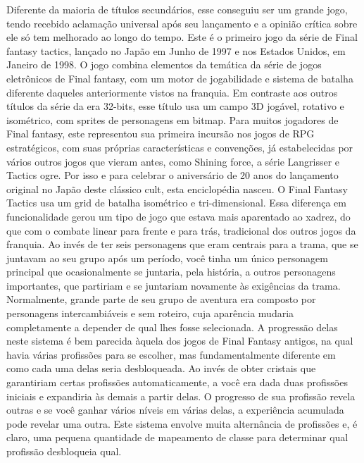 Diferente da maioria de títulos secundários, esse conseguiu ser um grande jogo, tendo recebido aclamação universal após seu lançamento e a opinião crítica sobre ele só tem melhorado ao longo do tempo.
Este é o primeiro jogo da série de Final fantasy tactics, lançado no Japão em Junho de 1997 e nos Estados Unidos, em Janeiro de 1998.
O jogo combina elementos da temática da série de jogos eletrônicos de Final fantasy, com um motor de jogabilidade e sistema de batalha diferente daqueles anteriormente vistos na franquia.
Em contraste aos outros títulos da série da era 32-bits, esse título usa um campo 3D jogável, rotativo e isométrico, com sprites de personagens em bitmap.
Para muitos jogadores de Final fantasy, este representou sua primeira incursão nos jogos de RPG estratégicos, com suas próprias características e convenções, já estabelecidas por vários outros jogos que vieram antes, como Shining force, a série Langrisser e Tactics ogre.
Por isso e para celebrar o aniversário de 20 anos do lançamento original no Japão deste clássico cult, esta enciclopédia nasceu.
%
\vfill
%
O Final Fantasy Tactics usa um grid de batalha isométrico e tri-dimensional.
Essa diferença em funcionalidade gerou um tipo de jogo que estava mais aparentado ao xadrez, do que com o combate linear para frente e para trás, tradicional dos outros jogos da franquia.
Ao invés de ter seis personagens que eram centrais para a trama, que se juntavam ao seu grupo após um período, você tinha um único personagem principal que ocasionalmente se juntaria, pela história, a outros personagens importantes, que partiriam e se juntariam novamente às exigências da trama.
Normalmente, grande parte de seu grupo de aventura era composto por personagens intercambiáveis e sem roteiro, cuja aparência mudaria completamente a depender de qual  lhes fosse selecionada.
A progressão delas neste sistema é bem parecida àquela dos jogos de Final Fantasy antigos, na qual havia várias profissões para se escolher, mas fundamentalmente diferente em como cada uma delas seria desbloqueada.
Ao invés de obter cristais que garantiriam certas profissões automaticamente, a você era dada duas profissões iniciais e expandiria às demais a partir delas.
O progresso de sua profissão revela outras e se você ganhar vários níveis em várias delas, a experiência acumulada pode revelar uma outra.
Este sistema envolve muita alternância de profissões e, é claro, uma pequena quantidade de mapeamento de classe para determinar qual profissão desbloqueia qual.
%
\vfill
%
\\\\
